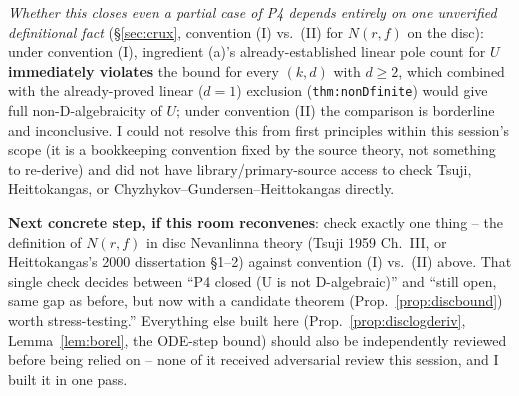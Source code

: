 \documentclass[11pt]{article}
\theoremstyle{remark}
\begin{document}
\emph{Whether this closes even a partial case of P4 depends entirely on one unverified
definitional fact} (\S\ref{sec:crux}, convention (I) vs.\ (II) for $N(r,f)$ on the disc): under
convention (I), ingredient (a)'s already-established linear pole count for $U$
\textbf{immediately violates} the bound for every $(k,d)$ with $d\ge2$, which combined with the
already-proved linear ($d=1$) exclusion (\texttt{thm:nonDfinite}) would give full non-D-algebraicity
of $U$; under convention (II) the comparison is borderline and inconclusive. I could not resolve
this from first principles within this session's scope (it is a bookkeeping convention fixed by
the source theory, not something to re-derive) and did not have library/primary-source access to
check Tsuji, Heittokangas, or Chyzhykov--Gundersen--Heittokangas directly.

\textbf{Next concrete step, if this room reconvenes}: check exactly one thing -- the definition of
$N(r,f)$ in disc Nevanlinna theory (Tsuji 1959 Ch.\ III, or Heittokangas's 2000 dissertation \S1--2)
against convention (I) vs.\ (II) above. That single check decides between ``P4 closed (U is not
D-algebraic)'' and ``still open, same gap as before, but now with a candidate theorem
(Prop.~\ref{prop:discbound}) worth stress-testing.'' Everything else built here
(Prop.~\ref{prop:disclogderiv}, Lemma~\ref{lem:borel}, the ODE-step bound) should also be
independently reviewed before being relied on -- none of it received adversarial review this
session, and I built it in one pass.
\end{document}
